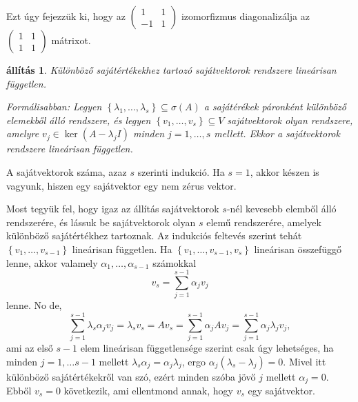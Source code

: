 \documentclass[a4paper, showtrims]{memoir}
\makeatletter
\renewenvironment{proof}[1][\proofname]
    {\par\pushQED{\qed}%
    \normalfont \topsep6\p@\@plus6\p@\relax
    \trivlist
    \item[\hskip\labelsep
        \itshape
    #1\@addpunct{:}]\ignorespaces}
    {\popQED\endtrivlist\@endpefalse}
\theoremstyle{plain}
\newtheorem{proposition}{állítás}[chapter]
\theoremstyle{remark}
\theoremstyle{definition}
\makeatother
\begin{document}
Ezt úgy fejezzük ki, hogy az
\begin{math}
	\begin{pmatrix}
		1  & 1 \\
		-1 & 1
	\end{pmatrix}
\end{math}
izomorfizmus diagonalizálja az
\begin{math}
	\begin{pmatrix}
		1 & 1 \\1&1
	\end{pmatrix}
\end{math}
mátrixot.
\begin{proposition}\label{pr:svlinfgtlen}
	Különböző sajátértékekhez tartozó sajátvektorok rendszere lineárisan független.

	Formálisabban:
	Legyen $\left\{ \lambda_1,\ldots,\lambda_s \right\}\subseteq \sigma\left( A \right)$
	a sajátérékek páronként különböző elemekből álló rendszere,
	és legyen $\left\{ v_1,\ldots,v_s \right\}\subseteq V$ sajátvektorok olyan rendszere,
	amelyre $v_j\in\ker\left( A-\lambda_jI \right)$ minden $j=1,\ldots,s$ mellett.
	Ekkor a sajátvektorok rendszere lineárisan független.
\end{proposition}
\begin{proof}
	A sajátvektorok száma, azaz $s$ szerinti indukció.
	Ha $s=1$, akkor készen is vagyunk,
	hiszen egy sajátvektor egy nem zérus vektor.

	Most tegyük fel, hogy igaz az állítás sajátvektorok $s$-nél kevesebb elemből álló rendszerére,
	és lássuk be sajátvektorok olyan $s$ elemű rendszerére, amelyek különböző sajátértékhez tartoznak.
	Az indukciós feltevés szerint tehát $\left\{ v_1,\ldots,v_{s-1} \right\}$ lineárisan független.
	Ha $\left\{ v_1,\ldots,v_{s-1},v_s \right\}$ lineárisan összefüggő lenne,
	akkor valamely $\alpha_1,\ldots,\alpha_{s-1}$ számokkal
	\[
		v_s=\sum_{j=1}^{s-1}\alpha_jv_j
	\]
	lenne.
	No de,
	\begin{equation*}
		\sum_{j=1}^{s-1}\lambda_s\alpha_jv_j
		=
		\lambda_sv_s
		=
		Av_s
		=
		\sum_{j=1}^{s-1}\alpha_jAv_j
		=
		\sum_{j=1}^{s-1}\alpha_j\lambda_jv_j,
	\end{equation*}
	ami az első $s-1$ elem lineárisan függetlensége szerint csak úgy lehetséges,
	ha minden $j=1,\dots s-1$ mellett
	\begin{math}
		\lambda_s\alpha_j
		=
		\alpha_j\lambda_j
	\end{math},
	ergo
	\begin{math}
		\alpha_j\left( \lambda_s-\lambda_j \right)
		=
		0.
	\end{math}
	Mivel itt különböző sajátértékekről van szó,
	ezért minden szóba jövő $j$ mellett $\alpha_j=0$.
	Ebből $v_s=0$ következik,
	ami ellentmond annak, hogy $v_s$ egy sajátvektor.
\end{proof}
\end{document}
